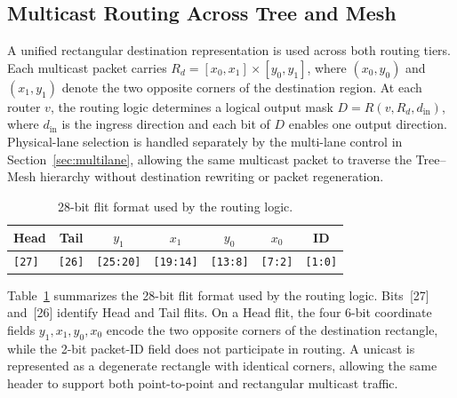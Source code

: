 \documentclass[conference]{IEEEtran}
\begin{document}
\subsection{Multicast Routing Across Tree and Mesh}\label{sec:multicast}

A unified rectangular destination representation is used across both
routing tiers. Each multicast packet carries
\(R_{d} = \left\lbrack x_{0},x_{1} \right\rbrack \times \left\lbrack y_{0},y_{1} \right\rbrack\),
where \(\left( x_{0},y_{0} \right)\) and \(\left( x_{1},y_{1} \right)\)
denote the two opposite corners of the destination region. At each
router \(v\), the routing logic determines a logical output mask
\(D = R\left( v,R_{d},d_{\mathrm{in}} \right)\), where \(d_{\mathrm{in}}\) is the ingress
direction and each bit of \(D\) enables one output direction.
Physical-lane selection is handled separately by the multi-lane control
in Section~\ref{sec:multilane}, allowing the same multicast packet to traverse the
Tree--Mesh hierarchy without destination rewriting or packet
regeneration.

\begin{table}[!t]
\caption{28-bit flit format used by the routing logic.}
\label{tab:flit-format}
\centering
\scriptsize
\setlength{\tabcolsep}{3.6pt}
\renewcommand{\arraystretch}{1.05}
\begin{tabular}{lcccccc}
\toprule
\textbf{Head} & \textbf{Tail} & \textbf{$y_1$} & \textbf{$x_1$} & \textbf{$y_0$} & \textbf{$x_0$} & \textbf{ID} \\
\midrule
\texttt{[27]} & \texttt{[26]} & \texttt{[25:20]} & \texttt{[19:14]} & \texttt{[13:8]} & \texttt{[7:2]} & \texttt{[1:0]} \\
\bottomrule
\end{tabular}
\end{table}

Table~\ref{tab:flit-format} summarizes the 28-bit flit format used by the
routing logic. Bits~[27] and~[26] identify Head and Tail flits. On a Head
flit, the four 6-bit coordinate fields \(y_1,x_1,y_0,x_0\) encode the two
opposite corners of the destination rectangle, while the 2-bit packet-ID
field does not participate in routing. A unicast is represented as a
degenerate rectangle with identical corners, allowing the same header to
support both point-to-point and rectangular multicast traffic.
\end{document}
